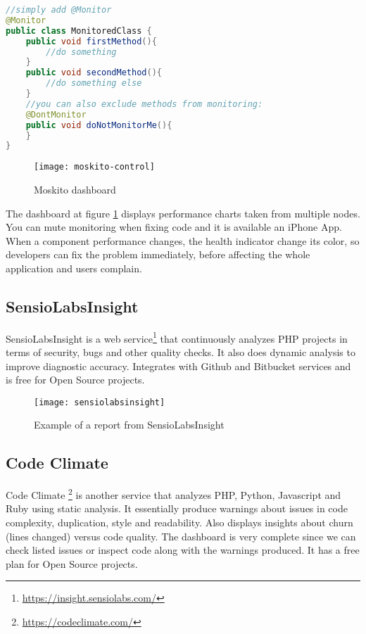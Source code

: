 \begin{lstlisting}[language=java, caption=Usage example from Moskito documentation]
//simply add @Monitor
@Monitor
public class MonitoredClass {
    public void firstMethod(){
        //do something
    }
    public void secondMethod(){
        //do something else
    }
    //you can also exclude methods from monitoring:
    @DontMonitor
    public void doNotMonitorMe(){
    }
}
\end{lstlisting}

\begin{figure}[H]
    \begin{center}
        \texttt{[image: moskito-control]}
        \caption{Moskito dashboard}
        \label{figure:moskito_dashboard}
    \end{center}
\end{figure}

The dashboard at figure \ref{figure:moskito_dashboard} displays performance charts taken from multiple nodes. You can mute monitoring when fixing code and it is available an iPhone App. When a component performance changes, the health indicator change its color, so developers can fix the problem immediately, before affecting the whole application and users complain.

\subsection{SensioLabsInsight}
SensioLabsInsight is a web service\footnote{\url{https://insight.sensiolabs.com/}} that continuously analyzes PHP projects in terms of security, bugs and other quality checks. It also does dynamic analysis to improve diagnostic accuracy. Integrates with Github and Bitbucket services and is free for Open Source projects.

\begin{figure}[H]
    \begin{center}
        \texttt{[image: sensiolabsinsight]}
        \caption{Example of a report from SensioLabsInsight}
        \label{figure:sensiolabsinsight}
    \end{center}
\end{figure}

\subsection{Code Climate}
Code Climate \footnote{\url{https://codeclimate.com/}} is another service that analyzes PHP, Python, Javascript and Ruby using static analysis. It essentially produce warnings about issues in code complexity, duplication, style and readability. Also displays insights about churn (lines changed) versus code quality. The dashboard is very complete since we can check listed issues or inspect code along with the warnings produced. It has a free plan for Open Source projects.

